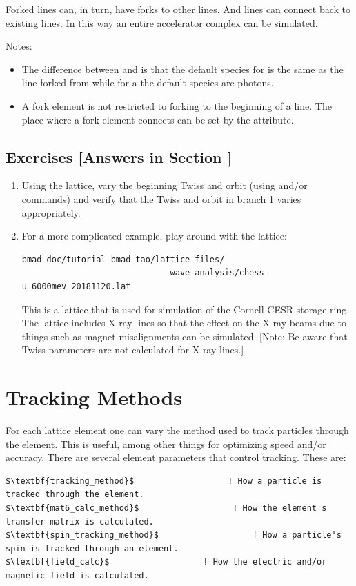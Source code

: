 \documentclass{hitec}     %
\newcommand{\Section}[1]{\section{#1}\vspace*{-1ex}}
\begin{document}
Forked lines can, in turn, have forks to other lines. And lines can connect back to existing lines. In this
way an entire accelerator complex can be simulated. 

Notes:
\vspace{-5 pt}
\begin{itemize}
\item
The difference between  and  is that the default species for  is
the same as the line forked from while for a  the default species are photons.
\item
A fork element is not restricted to forking to the beginning of a line.  The place where a fork
element connects can be set by the  attribute.
\end{itemize}


\subsection{Exercises [Answers in Section ]}
\label{s:fork.ex}

\begin{enumerate}[label=\thesection.\arabic{enumi}]
\item
Using the  lattice, vary the beginning Twiss and orbit (using  and/or
 commands) and verify that the Twiss and orbit in branch 1 varies appropriately.
%
\item
For a more complicated example, play around with the lattice:
\begin{lstlisting}[mathescape]
bmad-doc/tutorial_bmad_tao/lattice_files/
                              wave_analysis/chess-u_6000mev_20181120.lat
\end{lstlisting}
This is a lattice that is used for simulation of the Cornell CESR storage ring. The lattice includes
X-ray lines so that the effect on the X-ray beams due to things such as magnet misalignments can
be simulated. [Note: Be aware that Twiss parameters are not calculated for X-ray lines.]
\end{enumerate}

\newpage

\Section{Tracking Methods}
\label{s:methods}

For each lattice element one can vary the method used to track particles through the element. This is
useful, among other things for optimizing speed and/or accuracy. There are several element parameters
that control tracking. These are:
\begin{lstlisting}[mathescape]
$\textbf{tracking_method}$                   ! How a particle is tracked through the element.
$\textbf{mat6_calc_method}$                   ! How the element's transfer matrix is calculated.
$\textbf{spin_tracking_method}$                   ! How a particle's spin is tracked through an element.
$\textbf{field_calc}$                   ! How the electric and/or magnetic field is calculated.
\end{lstlisting}
\end{document}
